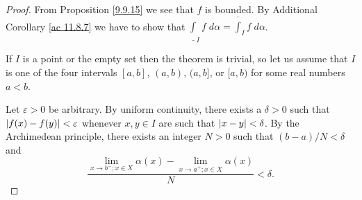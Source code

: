 \begin{proof}
    From Proposition \ref{9.9.15} we see that \(f\) is bounded.
    By Additional Corollary \ref{ac 11.8.7} we have to show that \(\underline{\int}_I f \; d \alpha = \overline{\int}_I f \; d \alpha\).

    If \(I\) is a point or the empty set then the theorem is trivial, so let us assume that \(I\) is one of the four intervals \([a, b]\), \((a, b)\), \((a, b]\), or \([a, b)\) for some real numbers \(a < b\).

    Let \(\varepsilon > 0\) be arbitrary.
    By uniform continuity, there exists a \(\delta > 0\) such that \(\abs*{f(x) - f(y)} < \varepsilon\) whenever \(x, y \in I\) are such that \(\abs*{x - y} < \delta\).
    By the Archimedean principle, there exists an integer \(N > 0\) such that \((b - a) / N < \delta\) and
    \[
        \frac{\lim_{x \to b^- ; x \in X} \alpha(x) - \lim_{x \to a^+ ; x \in X} \alpha(x)}{N} < \delta.
    \]


\end{proof}

